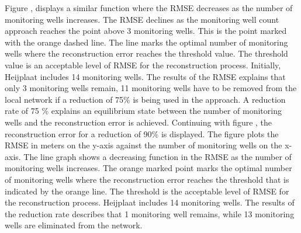 Figure , displays a similar function where the RMSE decreases as the number of monitoring wells increases. The RMSE declines as the monitoring well count approach reaches the point above 3 monitoring wells. This is the point marked with the orange dashed line. The line marks the optimal number of monitoring wells where the reconstruction error reaches the threshold value. The threshold value is an acceptable level of RMSE for the reconstruction process. Initially, Heijplaat includes 14 monitoring wells. The results of the RMSE explains that only 3 monitoring wells remain, 11 monitoring wells have to be removed from the local network if a reduction of 75\% is being used in the approach. A reduction rate of 75 \% explains an equilibrium state between the number of monitoring wells and the reconstruction error is achieved. 
\newline
Continuing with figure , the reconstruction error for a reduction of 90\% is displayed. The figure plots the RMSE in meters on the y-axis against the number of monitoring wells on the x-axis. The line graph shows a decreasing function in the RMSE as the number of monitoring wells increases. The orange marked point marks the optimal number of monitoring wells where the reconstruction error reaches the threshold that is indicated by the orange line. The threshold is the acceptable level of RMSE for the reconstruction process. Heijplaat includes 14 monitoring wells. The results of the reduction rate describes that 1 monitoring well remains, while 13 monitoring wells are eliminated from the network.

